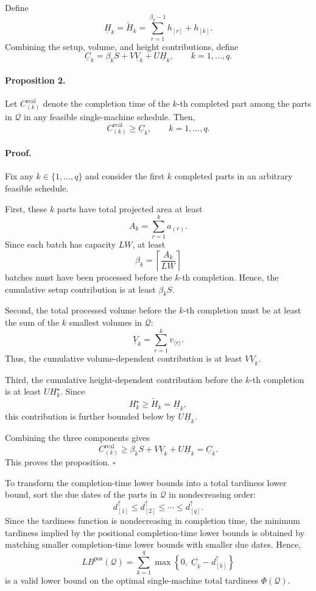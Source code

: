 \documentclass[letterpaper, 10 pt, conference]{ieeeconf}  %
\newcounter{proposition}
\begin{document}
Define
\[
\underline{H}_k=\widetilde{H}_k
=
\sum_{r=1}^{\beta_k-1}h_{[r]}+h_{[k]}.
\]
Combining the setup, volume, and height contributions, define
\[
\underline{C}_k
=
\beta_k S
+
V\underline{V}_k
+
U\underline{H}_k,
\qquad k=1,\dots,q.
\]

\paragraph*{Proposition 2.}
Let $C_{(k)}^{\mathrm{real}}$ denote the completion time of the $k$-th
completed part among the parts in $\mathcal{Q}$ in any feasible
single-machine schedule. Then,
\[
C_{(k)}^{\mathrm{real}}\ge \underline{C}_k,
\qquad k=1,\dots,q.
\]

\paragraph*{Proof.}
Fix any $k\in\{1,\dots,q\}$ and consider the first $k$ completed parts in an
arbitrary feasible schedule.

First, these $k$ parts have total projected area at least
\[
A_k=\sum_{r=1}^{k}a_{(r)}.
\]
Since each batch has capacity $LW$, at least
\[
\beta_k=\left\lceil\frac{A_k}{LW}\right\rceil
\]
batches must have been processed before the $k$-th completion. Hence, the
cumulative setup contribution is at least $\beta_k S$.

Second, the total processed volume before the $k$-th completion must be at
least the sum of the $k$ smallest volumes in $\mathcal{Q}$:
\[
\underline{V}_k=\sum_{r=1}^{k}v_{\langle r\rangle}.
\]
Thus, the cumulative volume-dependent contribution is at least
$V\underline{V}_k$.

Third, the cumulative height-dependent contribution before the $k$-th
completion is at least $UH_k^{\star}$. Since
\[
H_k^{\star}\ge \widetilde{H}_k=\underline{H}_k,
\]
this contribution is further bounded below by $U\underline{H}_k$.

Combining the three components gives
\[
C_{(k)}^{\mathrm{real}}
\ge
\beta_k S
+
V\underline{V}_k
+
U\underline{H}_k
=
\underline{C}_k.
\]
This proves the proposition.
\hfill $\square$

To transform the completion-time lower bounds into a total tardiness lower
bound, sort the due dates of the parts in $\mathcal{Q}$ in nondecreasing
order:
\[
d_{[1]}^{\uparrow}\le d_{[2]}^{\uparrow}\le \cdots \le d_{[q]}^{\uparrow}.
\]
Since the tardiness function is nondecreasing in completion time, the
minimum tardiness implied by the positional completion-time lower bounds is
obtained by matching smaller completion-time lower bounds with smaller due
dates. Hence,
\[
LB^{\mathrm{pos}}(\mathcal{Q})
=
\sum_{k=1}^{q}
\max
\left\{
0,\;
\underline{C}_k-d_{[k]}^{\uparrow}
\right\}
\]
is a valid lower bound on the optimal single-machine total tardiness
$\Phi(\mathcal{Q})$.
\end{document}
